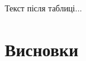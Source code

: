 \documentclass[12pt,a4paper,titlepage,oneside]{book}
\numberwithin{equation}{part}
\renewcommand{\theequation}{\thechapter.\arabic{equation}}
\begin{document}
Текст після таблиці...




\chapter*{Висновки}






%



\vspace{-5cm}
\setcounter{page}{3}







\end{document}
